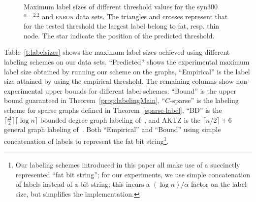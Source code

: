 \begin{figure}[!ht]
\centering
{}\hspace*{-2.5em}
%
\caption{Maximum label sizes of different threshold values for the   syn300$^{\alpha=2.2}$ and \textsc{enron} data sets.
The triangles and crosses represent that for the tested threshold the largest label belong to fat, resp. thin node. The star indicate the position of the predicted threshold.}
\label{fig:findings}%
\end{figure}

Table~\ref{t:labelsizes}  shows
 the maximum label sizes achieved using different labeling schemes on our data sets. ``Predicted'' shows the experimental maximum label size obtained by running our scheme on the graphs, ``Empirical'' is the label size attained by using the empirical threshold. The remaining columns show non-experimental upper bounds for different label schemes: ``Bound'' is the upper bound guaranteed in Theorem~\ref{prop:labelingMain}, ``$C$-sparse'' is  the labeling scheme for sparse graphs defined in Theorem~\ref{sparse-label}, ``BD'' is the $\lceil \frac{\Delta}{2} \rceil \lceil \log n\rceil$ bounded degree graph  labeling of~\cite{adjiashvili2014labeling}, and AKTZ is the $\lceil n/2\rceil+6$ general graph  labeling of~\cite{alstrup2014adjacency}.
Both ``Empirical'' and  ``Bound'' using simple concatenation of labels to represent the fat bit string\footnote{Our labeling schemes introduced in this paper all make use of a succinctly represented ``fat bit string''; for our experiments, we use simple concatenation of labels instead of a bit string; this incurs a $(\log n)/\alpha$ factor on the label size, but simplifies the implementation.}.
 

